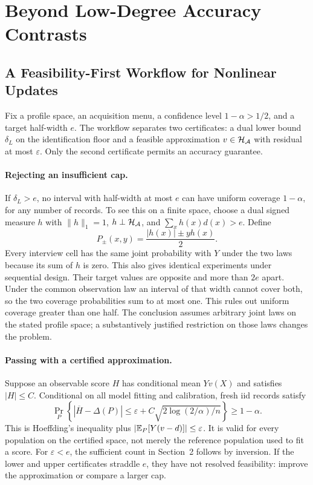 \section{Beyond Low-Degree Accuracy Contrasts}\label{app:G}
\subsection{A Feasibility-First Workflow for Nonlinear Updates}\label{app:workflow}
Fix a profile space, an acquisition menu, a confidence level $1-\alpha>1/2$,
and a target half-width $e$. The workflow separates two certificates:
a dual lower bound $\delta_L$ on the identification floor and a feasible
approximation $v\in\mathcal H_\mathcal A$ with residual at most $\varepsilon$.
Only the second certificate permits an accuracy guarantee.

\paragraph{Rejecting an insufficient cap.}
If $\delta_L>e$, no interval with half-width at most $e$ can have uniform
coverage $1-\alpha$, for any number of records. To see this on a finite
space, choose a dual signed measure $h$ with $\|h\|_1=1$,
$h\perp\mathcal H_\mathcal A$, and $\sum_xh(x)d(x)>e$.
Define
\[
 P_\pm(x,y)=\frac{|h(x)|\pm yh(x)}2.
\]
Every interview cell has the same joint probability with $Y$ under the
two laws because its sum of $h$ is zero. This also gives identical
experiments under sequential design. Their target values are opposite
and more than $2e$ apart. Under the common observation law an interval
of that width cannot cover both, so the two coverage probabilities sum
to at most one. This rules out uniform coverage greater than one half.
The conclusion assumes arbitrary joint laws on the stated profile space;
a substantively justified restriction on those laws changes the problem.

\paragraph{Passing with a certified approximation.}
Suppose an observable score $H$ has conditional mean $Yv(X)$ and satisfies
$|H|\le C$. Conditional on all model fitting and calibration, fresh iid
records satisfy
\[
 \Pr_P\!\left\{|\overline H-\Delta(P)|
 \le\varepsilon+C\sqrt{2\log(2/\alpha)/n}\right\}\ge1-\alpha.
\]
This is Hoeffding's inequality plus
$|\mathbb{E}_P[Y(v-d)]|\le\varepsilon$. It is valid for every population on the
certified space, not merely the reference population used to fit a score.
For $\varepsilon<e$, the sufficient count in Section~2 follows by inversion.
If the lower and upper certificates straddle $e$, they have not resolved
feasibility: improve the approximation or compare a larger cap.

